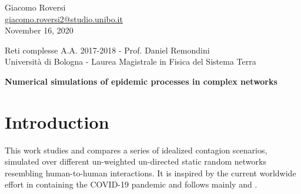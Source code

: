 \documentclass[DIV=12, BCOR=0pt]{scrartcl}  %
\begin{document}
%	
%



\begin{flushright}
	{\large Giacomo Roversi} \\ 
	{\small \href{mailto:giacomo.roversi2@studio.unibo.it}{giacomo.roversi2@studio.unibo.it} }\\
	\vskip0.15in
	{\large November 16, 2020}
\end{flushright}

\begin{flushleft}
	{\Large \color{gray}
		Reti complesse A.A. 2017-2018 - Prof. Daniel Remondini  \\
		Università di Bologna - Laurea Magistrale in Fisica del Sistema Terra}


	\vskip0.2in
	{\huge\textbf{Numerical simulations of epidemic processes in complex networks}} 
	\vskip0.33in
	
\end{flushleft}
	
	\section*{Introduction}
	\label{sec:intro}
	This work studies and compares a series of idealized contagion scenarios, simulated over different un-weighted un-directed static random networks resembling human-to-human interactions. It is inspired by the current worldwide effort in containing the COVID-19 pandemic and follows mainly \citet{PastorSatorras} and \citep{Firth2020}.
	
\end{document}
